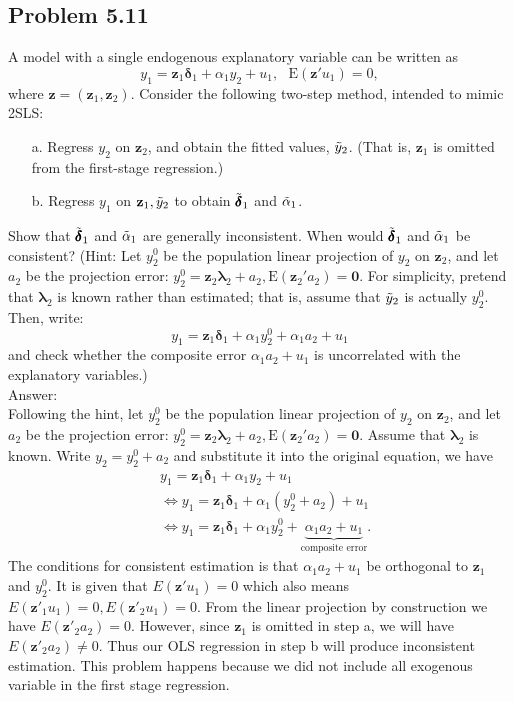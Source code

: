 \documentclass[10pt]{article}
\newcommand{\E}{\text{E}}
\begin{document}
\subsection*{Problem 5.11}
A model with a single endogenous explanatory variable can be written as
\[y_1=\textbf{z}_1\pmb{\delta}_1+\alpha_1y_2+u_1, \ \ \ \E(\textbf{z}'u_1)=0,\]
where $\textbf{z}=(\textbf{z}_1,\textbf{z}_2)$. Consider the following two-step method, intended to mimic 2SLS:
\begin{enumerate}
    \item[a.] Regress $y_2$ on $\textbf{z}_2$, and obtain the fitted values, $\Tilde{y}_2$. (That is, $\textbf{z}_1$ is omitted from the first-stage regression.)
    \item[b.] Regress $y_1$ on $\textbf{z}_1, \Tilde{y}_2$ to obtain $\Tilde{\pmb{\delta}}_1$ and $\Tilde{\alpha}_1$. 
\end{enumerate}
Show that $\Tilde{\pmb{\delta}}_1$ and $\Tilde{\alpha}_1$ are generally inconsistent. When would $\Tilde{\pmb{\delta}}_1$ and $\Tilde{\alpha}_1$ be consistent? (Hint: Let $y_2^0$ be the population linear projection of $y_2$ on $\textbf{z}_2$, and let $a_2$ be the projection error: $y_2^0=\textbf{z}_2\pmb{\lambda}_2+a_2, \E(\textbf{z}_2'a_2)=\textbf{0}$. For simplicity, pretend that $\pmb{\lambda}_2$ is known rather than estimated; that is, assume that $\Tilde{y}_2$ is actually $y_2^0.$ Then, write:
\[y_1=\textbf{z}_1\pmb{\delta}_1+\alpha_1y_2^0+\alpha_1a_2+u_1\]
and check whether the composite error $\alpha_1a_2+u_1$ is uncorrelated with the explanatory variables.)
\\ Answer:\\
Following the hint, let $y_2^0$ be the population linear projection of $y_2$ on $\textbf{z}_2$, and let $a_2$ be the projection error: $y_2^0=\textbf{z}_2\pmb{\lambda}_2+a_2, \E(\textbf{z}_2'a_2)=\textbf{0}$. Assume that $\pmb{\lambda}_2$ is known. Write $y_2=y_2^0+a_2$ and substitute it into the original equation, we have
\begin{align*}
    &y_1=\textbf{z}_1\pmb{\delta}_1+\alpha_1y_2+u_1 \\
    &\Leftrightarrow y_1=\textbf{z}_1\pmb{\delta}_1+\alpha_1(y_2^0+a_2)+u_1 \\
    &\Leftrightarrow y_1=\textbf{z}_1\pmb{\delta}_1+\alpha_1y_2^0+\underbrace{\alpha_1 a_2+u_1}_{\displaystyle \text{composite error}}.
\end{align*}
The conditions for consistent estimation is that $\alpha_1 a_2+u_1$ be orthogonal to $\textbf{z}_1$ and $y_2^0$. It is given that $E(\textbf{z}'u_1)=0$ which also means $E(\textbf{z}'_1u_1)=0,E(\textbf{z}'_2u_1)=0$. From the linear projection by construction we have $E(\textbf{z}'_2a_2)=0$. However, since $\textbf{z}_1$ is omitted in step a, we will have $E(\textbf{z}'_2a_2)\neq0$. Thus our OLS regression in step b will produce inconsistent estimation. This problem happens because we did not include all exogenous variable in the first stage regression.
\end{document}
